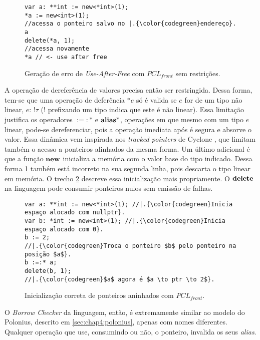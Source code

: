 \begin{figure}[ht]
	\caption{Geração de erro de \emph{Use-After-Free} com $PCL_{front}$ sem restrições.}
	\label{fig:pcl-front:uaf}
	\begin{lstlisting}[language=PCLfront]
var a: **int := new<*int>(1);
*a := new<int>(1);
//acessa o ponteiro salvo no |.{\color{codegreen}endereço}. a
delete(*a, 1);
//acessa novamente
*a // <- use after free
	\end{lstlisting}
\end{figure}

A operação de dereferência de valores precisa então ser restringida. Dessa forma, tem-se que uma operação de deferência $\text{*}\!e$ só é valida se $e$ for de um tipo não linear, $e\!:\,!\tau$ ($!$ prefixando um tipo indica que este é não linear). Essa limitação justifica os operadores $:=:\!\!\text{*}$ e $\mathbf{alias}\text{*}$, operações em que mesmo com um tipo $e$ linear, pode-se dereferenciar, pois a operação imediata após é segura e absorve o valor. Essa dinâmica vem inspirada nos \emph{tracked pointers} de Cyclone \cite[p.6]{CYCLONEMEM}, que limitam também o acesso a ponteiros alinhados da mesma forma. Um último adicional é que a função $\mathbf{new}$ inicializa a memória com o valor base do tipo indicado. Dessa forma \ref{fig:pcl-front:uaf} também está incorreto na sua segunda linha, pois descarta o tipo linear em memória. O trecho \ref{fig:pcl-front:init} descreve essa inicialização mais propriamente. O $\mathbf{delete}$ na linguagem pode consumir ponteiros nulos sem emissão de falhas.

\begin{figure}[ht]
	\caption{Inicialização correta de ponteiros aninhados com $PCL_{front}$.}
	\label{fig:pcl-front:init}
	\begin{lstlisting}[language=PCLfront]
var a: **int := new<*int>(1); //|.{\color{codegreen}Inicia espaço alocado com nullptr}.
var b: *int := new<int>(1); //|.{\color{codegreen}Inicia espaço alocado com 0}.
b := 2;
//|.{\color{codegreen}Troca o ponteiro $b$ pelo ponteiro na posição $a$}. 
b :=:* a;
delete(b, 1);
//|.{\color{codegreen}$a$ agora é $a \to ptr \to 2$}. 
	\end{lstlisting}
\end{figure}

O \emph{Borrow Checker} da linguagem, então, é extremamente similar ao modelo do Polonius, descrito em \ref{sec:chap4:polonius}, apenas com nomes diferentes. Qualquer operação que use, consumindo ou não, o ponteiro, invalida os seus \emph{alias}.
